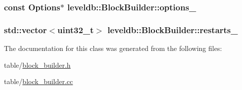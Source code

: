 \hypertarget{classleveldb_1_1_block_builder_ac3f2a6bc77ee0f695192c54465d59e92}{
\subsubsection[{options\-\_\-}]{\setlength{\rightskip}{0pt plus 5cm}const {\bf Options}$\ast$ leveldb\-::\-Block\-Builder\-::options\-\_\-\hspace{0.3cm}{\ttfamily [private]}}}\label{classleveldb_1_1_block_builder_ac3f2a6bc77ee0f695192c54465d59e92}
\hypertarget{classleveldb_1_1_block_builder_ae3eedf26b4ac597e5190bef0c6b75179}{
\subsubsection[{restarts\-\_\-}]{\setlength{\rightskip}{0pt plus 5cm}std\-::vector$<${\bf uint32\-\_\-t}$>$ leveldb\-::\-Block\-Builder\-::restarts\-\_\-\hspace{0.3cm}{\ttfamily [private]}}}\label{classleveldb_1_1_block_builder_ae3eedf26b4ac597e5190bef0c6b75179}


The documentation for this class was generated from the following files\-:\begin{DoxyCompactItemize}
\item 
table/\hyperlink{block__builder_8h}{block\-\_\-builder.\-h}\item 
table/\hyperlink{block__builder_8cc}{block\-\_\-builder.\-cc}\end{DoxyCompactItemize}
